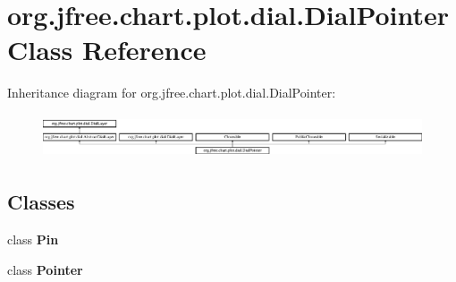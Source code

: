 \hypertarget{classorg_1_1jfree_1_1chart_1_1plot_1_1dial_1_1_dial_pointer}{}\section{org.\+jfree.\+chart.\+plot.\+dial.\+Dial\+Pointer Class Reference}
\label{classorg_1_1jfree_1_1chart_1_1plot_1_1dial_1_1_dial_pointer}
Inheritance diagram for org.\+jfree.\+chart.\+plot.\+dial.\+Dial\+Pointer\+:\begin{figure}[H]
\begin{center}
\leavevmode
\includegraphics[height=1.312500cm]{classorg_1_1jfree_1_1chart_1_1plot_1_1dial_1_1_dial_pointer}
\end{center}
\end{figure}
\subsection*{Classes}
\begin{DoxyCompactItemize}
\item 
class {\bfseries Pin}
\item 
class {\bfseries Pointer}
\end{DoxyCompactItemize}
